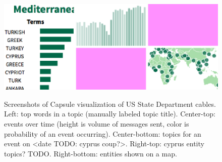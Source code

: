\begin{figure}
\centering
\includegraphics[width=\linewidth]{fig/viz.png}
\label{fig:viz}
\vskip -12pt
\caption{Screenshots of Capsule visualization of US State Department cables.  Left: top words in a topic (manually labeled topic title).  Center-top: events over time (height is volume of messages sent, color is probability of an event occurring).  Center-bottom: topics for an event on <date TODO: cyprus coup?>.  Right-top: cyprus entity topics? TODO.  Right-bottom: entities shown on a map.}
\end{figure}
